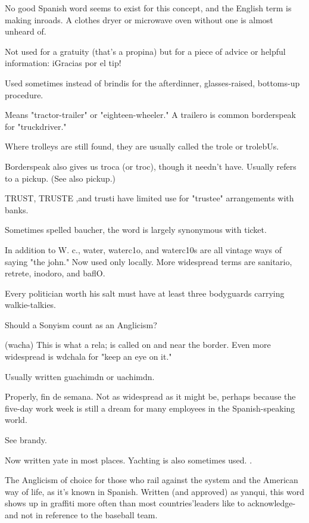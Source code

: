  No good Spanish word seems to exist for this concept,
and the English term is making inroads. A clothes dryer or microwave
oven without one is almost unheard of.

 Not used for a gratuity (that's a propina) but for a piece of
advice or helpful information: iGracias por el tip!

 Used sometimes instead of brindis for the afterdinner, glasses-raised, bottoms-up procedure.

 Means "tractor-trailer" or "eighteen-wheeler." A
trailero is common borderspeak for "truckdriver."

 Where trolleys are still found, they are usually
called the trole or trolebUs.

 Borderspeak also gives us troca (or troc), though it
needn't have. Usually refers to a pickup. (See also pickup.)

 TRUST, TRUSTE ,and trusti have limited use for
"trustee" arrangements with banks.

 Sometimes spelled baucher, the word is largely
synonymous with ticket.

 In addition to W. c., water, waterc1o, and waterc10s are
all vintage ways of saying "the john." Now used only locally. More
widespread terms are sanitario, retrete, inodoro, and baflO.

 Every politician worth his salt must have at
least three bodyguards carrying walkie-talkies.

 Should a Sonyism count as an Anglicism?

 (wacha) This is what a rela; is called on and near the
border. Even more widespread is wdchala for "keep an eye on it."

 Usually written guachimdn or uachimdn.

 Properly, fin de semana. Not as widespread as it
might be, perhaps because the five-day work week is still a dream for
many employees in the Spanish-speaking world.

 See brandy.

 Now written yate in most places. Yachting is also
sometimes used. .

 The Anglicism of choice for those who rail against
the system and the American way of life, as it's known in Spanish.
Written (and approved) as yanqui, this word shows up in graffiti more
often than most countries'leaders like to acknowledge-and not in
reference to the baseball team.

